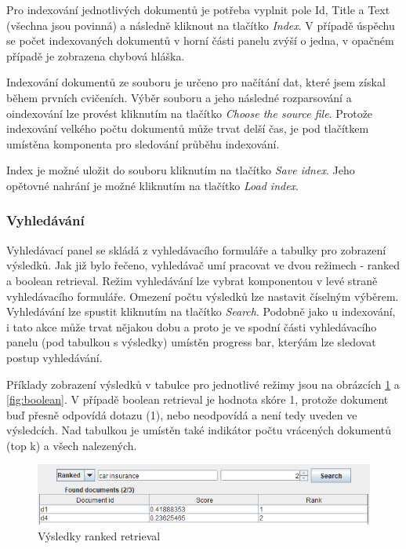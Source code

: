 \documentclass[11pt,a4paper]{scrartcl}
\begin{document}
	Pro indexování jednotlivých dokumentů je potřeba vyplnit pole Id, Title a Text (všechna jsou povinná) a následně kliknout na tlačítko \textit{Index}. V případě úspěchu se počet indexovaných dokumentů v horní části panelu zvýší o jedna, v opačném případě je zobrazena chybová hláška.
	
	Indexování dokumentů ze souboru je určeno pro načítání dat, které jsem získal během prvních cvičeních. Výběr souboru a jeho následné rozparsování a oindexování lze provést kliknutím na tlačítko \textit{Choose the source file}. Protože indexování velkého počtu dokumentů může trvat delší čas, je pod tlačítkem umístěna komponenta pro sledování průběhu indexování. 
	
	Index je možné uložit do souboru kliknutím na tlačítko \textit{Save idnex}. Jeho opětovné nahrání je možné kliknutím na tlačítko \textit{Load index}.

	\subsubsection{Vyhledávání}

	Vyhledávací panel se skládá z vyhledávacího formuláře a tabulky pro zobrazení výsledků. Jak již bylo řečeno, vyhledávač umí pracovat ve dvou režimech - ranked a boolean retrieval. Režim vyhledávání lze vybrat komponentou v levé straně vyhledávacího formuláře. Omezení počtu výsledků lze nastavit číselným výběrem. Vyhledávání lze spustit kliknutím na tlačítko \textit{Search}. Podobně jako u indexování, i tato akce může trvat nějakou dobu a proto je ve spodní části vyhledávacího panelu (pod tabulkou s výsledky) umístěn progress bar, kterýám lze sledovat postup vyhledávání.   
	
	Příklady zobrazení výsledků v tabulce pro jednotlivé režimy jsou na obrázcích \ref{fig:ranked} a \ref{fig:boolean}. V případě boolean retrieval je hodnota skóre 1, protože dokument buď přesně odpovídá dotazu (1), nebo neodpovídá a není tedy uveden ve výsledcích. Nad tabulkou je umístěn také indikátor počtu vrácených dokumentů (top k) a všech nalezených.

	\begin{figure}[h]
		\centering
		\includegraphics[width=\linewidth]{gui-ranked-res}
		\caption{Výsledky ranked retrieval}
		\label{fig:ranked}
	\end{figure}
\end{document}
